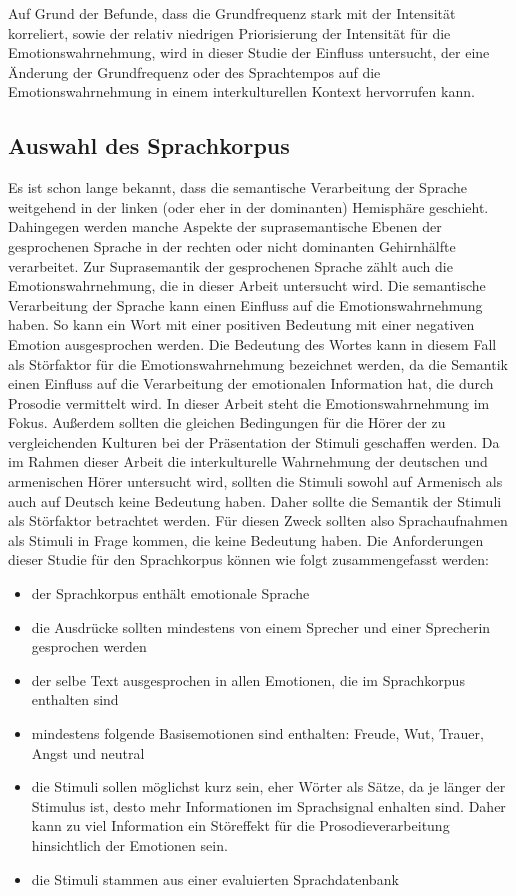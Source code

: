 \documentclass[11pt,a4paper,headsepline,twoside,toc=bibliography]{scrreprt}
\begin{document}
Auf Grund der Befunde, dass die Grundfrequenz stark mit der Intensität korreliert, sowie der relativ niedrigen Priorisierung der Intensität für die Emotionswahrnehmung, wird in dieser Studie der Einfluss untersucht, der eine Änderung der Grundfrequenz oder des Sprachtempos auf die Emotionswahrnehmung in einem interkulturellen Kontext hervorrufen kann.



\subsection{Auswahl des Sprachkorpus}
\label{sec:db}

Es ist schon lange bekannt, dass die semantische Verarbeitung der Sprache weitgehend in der linken (oder eher in der dominanten) Hemisphäre geschieht. Dahingegen werden manche Aspekte der suprasemantische Ebenen der gesprochenen Sprache in der rechten oder nicht dominanten Gehirnhälfte verarbeitet. Zur Suprasemantik der gesprochenen Sprache zählt auch die Emotionswahrnehmung, die in dieser Arbeit untersucht wird. Die semantische Verarbeitung der Sprache kann einen Einfluss auf die Emotionswahrnehmung haben. So kann ein Wort mit einer positiven Bedeutung mit einer negativen Emotion ausgesprochen werden. Die Bedeutung des Wortes kann in diesem Fall als Störfaktor für die Emotionswahrnehmung bezeichnet werden, da die Semantik einen Einfluss auf die Verarbeitung der emotionalen Information hat, die durch Prosodie vermittelt wird. In dieser Arbeit steht die Emotionswahrnehmung im Fokus. Außerdem sollten die gleichen Bedingungen für die Hörer der zu vergleichenden Kulturen bei der Präsentation der Stimuli geschaffen werden. Da im Rahmen dieser Arbeit die interkulturelle Wahrnehmung der deutschen und armenischen Hörer untersucht wird, sollten die Stimuli sowohl auf Armenisch als auch auf Deutsch keine Bedeutung haben. Daher sollte die Semantik der Stimuli als Störfaktor betrachtet werden. Für diesen Zweck sollten also Sprachaufnahmen als Stimuli in Frage kommen, die keine Bedeutung haben.  Die Anforderungen dieser Studie für den Sprachkorpus können wie folgt zusammengefasst werden: 


\begin{itemize}
	\item der Sprachkorpus enthält emotionale Sprache
	\item die Ausdrücke sollten mindestens von einem Sprecher und einer Sprecherin gesprochen werden 
	\item der selbe Text ausgesprochen in allen Emotionen, die im Sprachkorpus enthalten sind
	\item mindestens folgende Basisemotionen sind enthalten: Freude, Wut, Trauer, Angst und neutral
	\item die Stimuli sollen möglichst kurz sein, eher Wörter als Sätze, da je länger der Stimulus ist, desto mehr  Informationen im Sprachsignal enhalten sind. Daher kann zu viel Information ein Störeffekt für die Prosodieverarbeitung hinsichtlich der Emotionen sein.
	\item die Stimuli stammen aus einer evaluierten Sprachdatenbank
\end{itemize}
\end{document}

